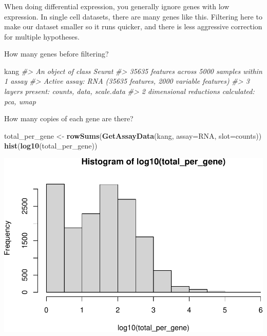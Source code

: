 \documentclass[
]{book}
\newenvironment{Shaded}{\begin{snugshade}}{\end{snugshade}}
\newcommand{\AttributeTok}[1]{\textcolor[rgb]{0.13,0.29,0.53}{#1}}
\newcommand{\CommentTok}[1]{\textcolor[rgb]{0.56,0.35,0.01}{\textit{#1}}}
\newcommand{\FunctionTok}[1]{\textcolor[rgb]{0.13,0.29,0.53}{\textbf{#1}}}
\newcommand{\NormalTok}[1]{#1}
\newcommand{\OtherTok}[1]{\textcolor[rgb]{0.56,0.35,0.01}{#1}}
\newcommand{\StringTok}[1]{\textcolor[rgb]{0.31,0.60,0.02}{#1}}
\begin{document}
\subsubsection*{}\label{section-11}

When doing differential expression, you generally ignore genes with low expression.
In single cell datasets, there are many genes like this. Filtering here to make our dataset smaller so it runs quicker, and there is less aggressive correction for multiple hypotheses.

How many genes before filtering?

\begin{Shaded}
\begin{Highlighting}[]
\NormalTok{kang}
\CommentTok{\#\textgreater{} An object of class Seurat }
\CommentTok{\#\textgreater{} 35635 features across 5000 samples within 1 assay }
\CommentTok{\#\textgreater{} Active assay: RNA (35635 features, 2000 variable features)}
\CommentTok{\#\textgreater{}  3 layers present: counts, data, scale.data}
\CommentTok{\#\textgreater{}  2 dimensional reductions calculated: pca, umap}
\end{Highlighting}
\end{Shaded}

How many copies of each gene are there?

\begin{Shaded}
\begin{Highlighting}[]
\NormalTok{total\_per\_gene }\OtherTok{\textless{}{-}} \FunctionTok{rowSums}\NormalTok{(}\FunctionTok{GetAssayData}\NormalTok{(kang, }\AttributeTok{assay=}\StringTok{\textquotesingle{}RNA\textquotesingle{}}\NormalTok{, }\AttributeTok{slot=}\StringTok{\textquotesingle{}counts\textquotesingle{}}\NormalTok{))}
\FunctionTok{hist}\NormalTok{(}\FunctionTok{log10}\NormalTok{(total\_per\_gene))}
\end{Highlighting}
\end{Shaded}

\includegraphics{scRNAseqInR_Doco_files/figure-latex/unnamed-chunk-48-1.pdf}
\end{document}

